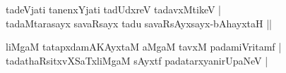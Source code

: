 \begin{entry}
\smallskip
\begin{shl}
tadeVjati tanenxYjati tadUdxreV tadavxMtikeV |\\
tadaMtarasayx savaRsayx tadu savaRsAyxsayx-bAhayxtaH ||
\end{shl}
\medskip
{}
\smallskip
\begin{shl}
liMgaM tatapxdamAKAyxtaM aMgaM tavxM padamiVritamf |\\
tadathaRsitxvXSaTxliMgaM sAyxtf padatarxyanirUpaNeV |
\end{shl}
\medskip
{}
\end{entry}

